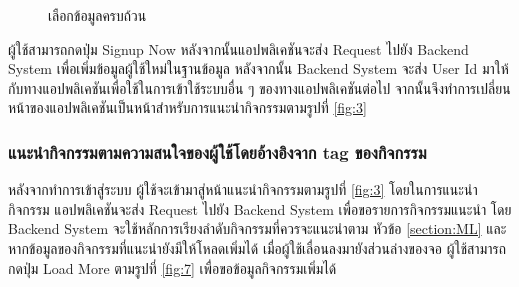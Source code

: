 \documentclass[14pt,oneside,openright,a4paper]{cpe-thai-project}
\begin{document}
 \begin{figure}[H]\centering
  \setlength{\fboxrule}{0.5mm}
  \setlength{\fboxsep}{0.5cm}
  \caption{เลือกข้อมูลครบถ้วน}\label{fig:FullRequestDataUser}
 \end{figure}

ผู้ใช้สามารถกดปุ่ม Signup Now หลังจากนั้นแอปพลิเคชันจะส่ง Request ไปยัง Backend System เพื่อเพิ่มข้อมูลผู้ใช้ใหม่ในฐานข้อมูล หลังจากนั้น Backend System จะส่ง User Id 
มาให้กับทางแอปพลิเคชันเพื่อใช้ในการเข้าใช้ระบบอื่น ๆ ของทางแอปพลิเคชันต่อไป จากนั้นจึงทำการเปลี่ยนหน้าของแอปพลิเคชันเป็นหน้าสำหรับการแนะนำกิจกรรมตามรูปที่ \ref{fig:3} 

\subsubsection{แนะนํากิจกรรมตามความสนใจของผู้ใช้โดยอ้างอิงจาก tag ของกิจกรรม}
หลังจากทำการเข้าสู่ระบบ ผู้ใช้จะเข้ามาสู่หน้าแนะนำกิจกรรมตามรูปที่ \ref{fig:3} โดยในการแนะนำกิจกรรม แอปพลิเคชันจะส่ง Request ไปยัง Backend System 
เพื่อขอรายการกิจกรรมแนะนำ โดย Backend System จะใช้หลักการเรียงลำดับกิจกรรมที่ควรจะแนะนำตาม
หัวข้อ \ref{section:ML} และหากข้อมูลของกิจกรรมที่แนะนำยังมีให้โหลดเพิ่มได้ เมื่อผู้ใช้เลื่อนลงมายังส่วนล่างของจอ ผู้ใช้สามารถกดปุ่ม Load More ตามรูปที่ \ref{fig:7} เพื่อขอข้อมูลกิจกรรมเพิ่มได้
\end{document}
